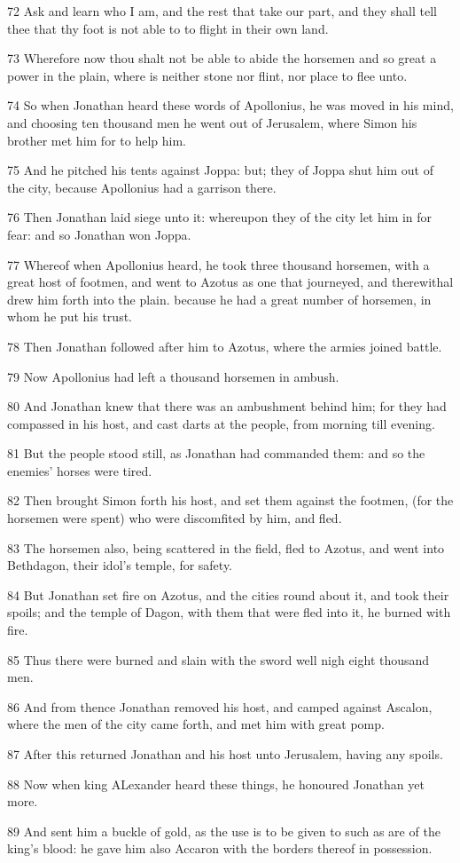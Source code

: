 \par 72 Ask and learn who I am, and the rest that take our part, and they shall tell thee that thy foot is not able to to flight in their own land.
\par 73 Wherefore now thou shalt not be able to abide the horsemen and so great a power in the plain, where is neither stone nor flint, nor place to flee unto.
\par 74 So when Jonathan heard these words of Apollonius, he was moved in his mind, and choosing ten thousand men he went out of Jerusalem, where Simon his brother met him for to help him.
\par 75 And he pitched his tents against Joppa: but; they of Joppa shut him out of the city, because Apollonius had a garrison there.
\par 76 Then Jonathan laid siege unto it: whereupon they of the city let him in for fear: and so Jonathan won Joppa.
\par 77 Whereof when Apollonius heard, he took three thousand horsemen, with a great host of footmen, and went to Azotus as one that journeyed, and therewithal drew him forth into the plain. because he had a great number of horsemen, in whom he put his trust.
\par 78 Then Jonathan followed after him to Azotus, where the armies joined battle.
\par 79 Now Apollonius had left a thousand horsemen in ambush.
\par 80 And Jonathan knew that there was an ambushment behind him; for they had compassed in his host, and cast darts at the people, from morning till evening.
\par 81 But the people stood still, as Jonathan had commanded them: and so the enemies' horses were tired.
\par 82 Then brought Simon forth his host, and set them against the footmen, (for the horsemen were spent) who were discomfited by him, and fled.
\par 83 The horsemen also, being scattered in the field, fled to Azotus, and went into Bethdagon, their idol's temple, for safety.
\par 84 But Jonathan set fire on Azotus, and the cities round about it, and took their spoils; and the temple of Dagon, with them that were fled into it, he burned with fire.
\par 85 Thus there were burned and slain with the sword well nigh eight thousand men.
\par 86 And from thence Jonathan removed his host, and camped against Ascalon, where the men of the city came forth, and met him with great pomp.
\par 87 After this returned Jonathan and his host unto Jerusalem, having any spoils.
\par 88 Now when king ALexander heard these things, he honoured Jonathan yet more.
\par 89 And sent him a buckle of gold, as the use is to be given to such as are of the king's blood: he gave him also Accaron with the borders thereof in possession.

